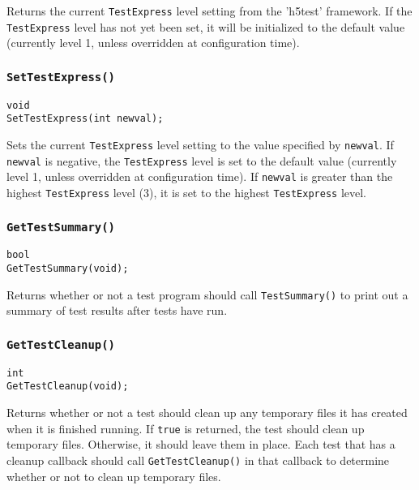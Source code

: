\documentclass[../HDF5_RFC.tex]{subfiles}
\begin{document}
Returns the current \texttt{TestExpress} level setting from the 'h5test' framework. If the
\texttt{TestExpress} level has not yet been set, it will be initialized to the default value
(currently level 1, unless overridden at configuration time).

\subsubsection{\texttt{SetTestExpress()}}

\begin{verbatim}
void
SetTestExpress(int newval);
\end{verbatim}

Sets the current \texttt{TestExpress} level setting to the value specified by \texttt{newval}. If \texttt{newval} is negative, the \texttt{TestExpress} level is set to the default value (currently
level 1, unless overridden at configuration time). If \texttt{newval} is greater than the highest
\texttt{TestExpress} level (3), it is set to the highest \texttt{TestExpress} level.

\subsubsection{\texttt{GetTestSummary()}}

\begin{verbatim}
bool
GetTestSummary(void);
\end{verbatim}

Returns whether or not a test program should call \texttt{TestSummary()} to print out a summary of
test results after tests have run.

\subsubsection{\texttt{GetTestCleanup()}}
\label{apdx:testframe_gettestcleanup}

\begin{verbatim}
int
GetTestCleanup(void);
\end{verbatim}

Returns whether or not a test should clean up any temporary files it has created when it is finished
running. If \texttt{true} is returned, the test should clean up temporary files. Otherwise, it should
leave them in place. Each test that has a cleanup callback should call \texttt{GetTestCleanup()} in
that callback to determine whether or not to clean up temporary files.
\end{document}
